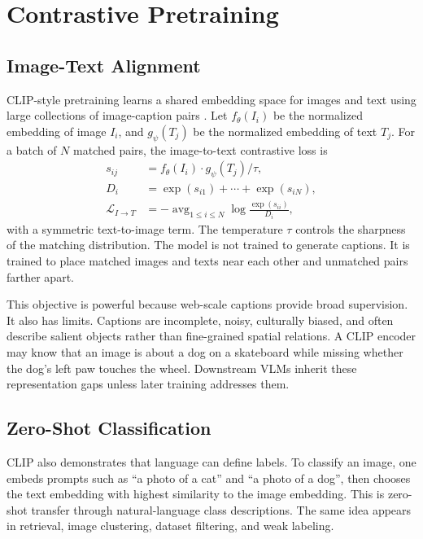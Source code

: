 \section{Contrastive Pretraining}
\subsection{Image-Text Alignment}
CLIP-style pretraining learns a shared embedding space for images and text using large collections of image-caption pairs \cite{radford2021learning}. Let $f_\theta(I_i)$ be the normalized embedding of image $I_i$, and $g_\psi(T_j)$ be the normalized embedding of text $T_j$. For a batch of $N$ matched pairs, the image-to-text contrastive loss is
\[
    \begin{aligned}
    s_{ij} &= f_\theta(I_i)\cdot g_\psi(T_j)/\tau,\\
    D_i &= \exp(s_{i1})+\cdots+\exp(s_{iN}),\\
    \mathcal{L}_{I\rightarrow T}
      &= -\operatorname{avg}_{1\le i\le N}
         \log \frac{\exp(s_{ii})}{D_i},
    \end{aligned}
\]
with a symmetric text-to-image term. The temperature $\tau$ controls the sharpness of the matching distribution. The model is not trained to generate captions. It is trained to place matched images and texts near each other and unmatched pairs farther apart.

This objective is powerful because web-scale captions provide broad supervision. It also has limits. Captions are incomplete, noisy, culturally biased, and often describe salient objects rather than fine-grained spatial relations. A CLIP encoder may know that an image is about a dog on a skateboard while missing whether the dog's left paw touches the wheel. Downstream VLMs inherit these representation gaps unless later training addresses them.

\subsection{Zero-Shot Classification}
CLIP also demonstrates that language can define labels. To classify an image, one embeds prompts such as ``a photo of a cat'' and ``a photo of a dog'', then chooses the text embedding with highest similarity to the image embedding. This is zero-shot transfer through natural-language class descriptions. The same idea appears in retrieval, image clustering, dataset filtering, and weak labeling.

